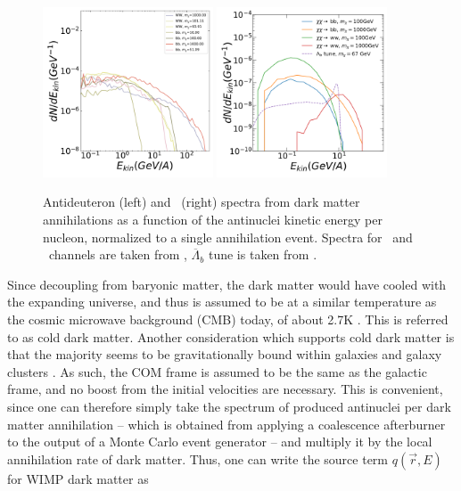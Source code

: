 \begin{figure}
    \centering
    \includegraphics[width=0.45\textwidth]{figures/dbar_injectionSpectra.pdf}
    \includegraphics[width=0.45\textwidth]{figures/He3bar_injection_channels.png}
    \caption{Antideuteron (left) and \ahe\ (right) spectra from dark matter annihilations as a function of the antinuclei kinetic energy per nucleon, normalized to a single annihilation event. Spectra for \WW\ and \bb\ channels are taken from \cite{Ibarra:2012cc}, $\overline{\Lambda}_b$ tune is taken from \cite{Winkler_2021}.}
    \label{fig:DMsource_spectra}
\end{figure}


Since decoupling from baryonic matter, the dark matter would have cooled with the expanding universe, and thus is assumed to be at a similar temperature as the cosmic microwave background (CMB) today, of about 2.7K \cite{CMB_temp}. This is referred to as cold dark matter. Another consideration which supports cold dark matter is that the majority seems to be gravitationally bound within galaxies and galaxy clusters \cite{Doetinchem_2020_review, GAPS_setup_Bird, Baushev_2013, DM_review}. As such, the COM frame is assumed to be the same as the galactic frame, and no boost from the initial velocities are necessary. This is convenient, since one can therefore simply take the spectrum of produced antinuclei per dark matter annihilation -- which is obtained from applying a coalescence afterburner to the output of a Monte Carlo event generator -- and multiply it by the local annihilation rate of dark matter. Thus, one can write the source term $q(\vec{r}, E)$ for WIMP dark matter as


